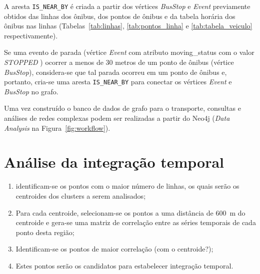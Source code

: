 A aresta \texttt{IS\_NEAR\_BY} é criada a partir dos vértices \emph{BusStop} e \emph{Event} previamente obtidos das linhas dos ônibus, dos pontos de ônibus e da tabela horária dos ônibus nas linhas (Tabelas~\ref{tab:linhas}, \ref{tab:pontos_linha} e \ref{tab:tabela_veiculo} respectivamente). 

Se uma evento de parada (vértice \emph{Event} com atributo moving\_status com o valor \emph{STOPPED} ) ocorrer a menos de 30 metros de um ponto de ônibus (vértice \emph{BusStop}), considera-se que tal parada ocorreu em um ponto de ônibus e, portanto, cria-se uma aresta \texttt{IS\_NEAR\_BY} para conectar os vértices \emph{Event} e \emph{BusStop} no grafo.

Uma vez construído o banco de dados de grafo para o transporte, consultas e análises de redes complexas podem ser realizadas a partir do Neo4j (\emph{Data Analysis} na Figura~\ref{fig:workflow}).

\section{Análise da integração temporal}
\label{sec:itemporal}




\begin{enumerate}
    \item identificam-se os pontos com o maior número de linhas, os quais serão os centroides dos clusters a serem analisados;
    
    
    \item Para cada centroide, selecionam-se os pontos a uma distância de 600~m do centroide e gera-se uma matriz de correlação entre as séries temporais de cada ponto desta região;
    
    \item Identificam-se os pontos de maior correlação (com o centroide?);
    \item Estes pontos serão os candidatos para estabelecer integração temporal.
\end{enumerate}

